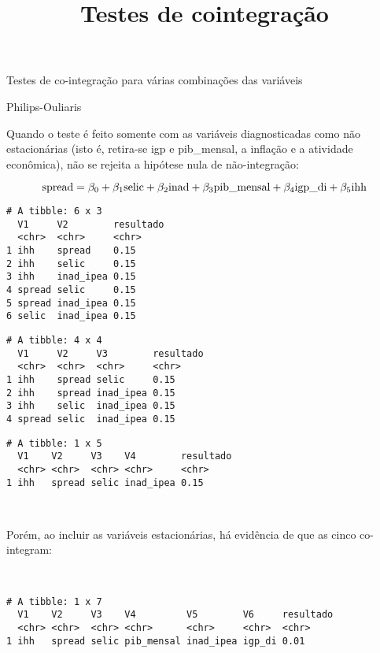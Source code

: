 \documentclass[]{article}
\title{Testes de cointegração}
\author{}
\date{}
\begin{document}
\maketitle

\begin{center}\LARGE{Testes de co-integração para várias combinações das variáveis}\end{center}\begin{center}\large{Philips-Ouliaris}\end{center}

Quando o teste é feito somente com as variáveis diagnosticadas como não
estacionárias (isto é, retira-se igp e pib\_mensal, a inflação e a
atividade econômica), não se rejeita a hipótese nula de não-integração:

\[ \text{spread} = \beta_0 + \beta_1\text{selic} + \beta_2\text{inad} + \beta_3\text{pib\_mensal\*} + \beta_4\text{igp\_di\*} + \beta_5\text{ihh} \]

\begin{verbatim}
# A tibble: 6 x 3
  V1     V2        resultado
  <chr>  <chr>     <chr>    
1 ihh    spread    0.15     
2 ihh    selic     0.15     
3 ihh    inad_ipea 0.15     
4 spread selic     0.15     
5 spread inad_ipea 0.15     
6 selic  inad_ipea 0.15     
\end{verbatim}

\begin{verbatim}
# A tibble: 4 x 4
  V1     V2     V3        resultado
  <chr>  <chr>  <chr>     <chr>    
1 ihh    spread selic     0.15     
2 ihh    spread inad_ipea 0.15     
3 ihh    selic  inad_ipea 0.15     
4 spread selic  inad_ipea 0.15     
\end{verbatim}

\begin{verbatim}
# A tibble: 1 x 5
  V1    V2     V3    V4        resultado
  <chr> <chr>  <chr> <chr>     <chr>    
1 ihh   spread selic inad_ipea 0.15     
\end{verbatim}

~ ~ ~ ~

Porém, ao incluir as variáveis estacionárias, há evidência de que as
cinco co-integram:

~ ~ ~ ~

\begin{verbatim}
# A tibble: 1 x 7
  V1    V2     V3    V4         V5        V6     resultado
  <chr> <chr>  <chr> <chr>      <chr>     <chr>  <chr>    
1 ihh   spread selic pib_mensal inad_ipea igp_di 0.01     
\end{verbatim}
\end{document}
